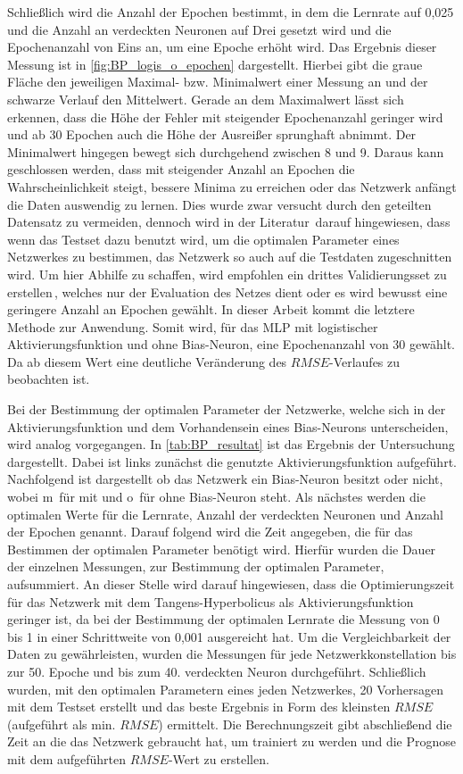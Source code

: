 Schließlich wird die Anzahl der Epochen bestimmt, in dem die Lernrate auf 0,025 und die Anzahl an verdeckten Neuronen auf Drei gesetzt wird und die Epochenanzahl von Eins an, um eine Epoche erhöht wird. Das Ergebnis dieser Messung ist in \autoref{fig:BP_logis_o_epochen} dargestellt. Hierbei gibt die graue Fläche den jeweiligen Maximal- bzw. Minimalwert einer Messung an und der schwarze Verlauf den Mittelwert. Gerade an dem Maximalwert lässt sich erkennen, dass die Höhe der Fehler mit steigender Epochenanzahl geringer wird und ab 30 Epochen auch die Höhe der Ausreißer sprunghaft abnimmt. Der Minimalwert hingegen bewegt sich durchgehend zwischen 8 und 9. Daraus kann geschlossen werden, dass mit steigender Anzahl an Epochen die Wahrscheinlichkeit steigt, bessere Minima zu erreichen oder das Netzwerk anfängt die Daten auswendig zu lernen. Dies wurde zwar versucht durch den geteilten Datensatz zu vermeiden, dennoch wird in der Literatur\, darauf hingewiesen, dass wenn das Testset dazu benutzt wird, um die optimalen Parameter eines Netzwerkes zu bestimmen, das Netzwerk so auch auf die Testdaten zugeschnitten wird. Um hier Abhilfe zu schaffen, wird empfohlen ein drittes Validierungsset zu erstellen\,, welches nur der Evaluation des Netzes dient oder es wird bewusst eine geringere Anzahl an Epochen gewählt. In dieser Arbeit kommt die letztere Methode zur Anwendung. Somit wird, für das MLP mit logistischer Aktivierungsfunktion und ohne Bias-Neuron, eine Epochenanzahl von 30 gewählt. Da ab diesem Wert eine deutliche Veränderung des $RMSE$-Verlaufes zu beobachten ist.

Bei der Bestimmung der optimalen Parameter der Netzwerke, welche sich in der Aktivierungsfunktion und dem Vorhandensein eines Bias-Neurons unterscheiden, wird analog vorgegangen.
In \autoref{tab:BP_resultat} ist das Ergebnis der Untersuchung dargestellt. Dabei ist links zunächst die genutzte Aktivierungsfunktion aufgeführt. Nachfolgend ist dargestellt ob das Netzwerk ein Bias-Neuron besitzt oder nicht, wobei \glqq m\grqq~für mit und \glqq o\grqq~für ohne Bias-Neuron steht. Als nächstes werden die optimalen Werte für die Lernrate, Anzahl der verdeckten Neuronen und Anzahl der Epochen genannt. Darauf folgend wird die Zeit angegeben, die für das Bestimmen der optimalen Parameter benötigt wird. Hierfür wurden die Dauer der einzelnen Messungen, zur Bestimmung der optimalen Parameter, aufsummiert. An dieser Stelle wird darauf hingewiesen, dass die Optimierungszeit für das Netzwerk mit dem Tangens-Hyperbolicus als Aktivierungsfunktion geringer ist, da bei der Bestimmung der optimalen Lernrate die Messung von 0 bis 1 in einer Schrittweite von 0,001 ausgereicht hat. Um die Vergleichbarkeit der Daten zu gewährleisten, wurden die Messungen für jede Netzwerkkonstellation bis zur 50. Epoche und bis zum 40. verdeckten Neuron durchgeführt. Schließlich wurden, mit den optimalen Parametern eines jeden Netzwerkes, 20 Vorhersagen mit dem Testset erstellt und das beste Ergebnis in Form des kleinsten $RMSE$ (aufgeführt als min. $RMSE$) ermittelt. Die Berechnungszeit gibt abschließend die Zeit an die das Netzwerk gebraucht hat, um trainiert zu werden und die Prognose mit dem aufgeführten $RMSE$-Wert zu erstellen. 


